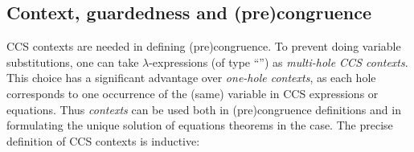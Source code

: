 
\subsection{Context, guardedness and (pre)congruence}
\label{ss:context}

CCS contexts are needed in defining (pre)congruence.
To prevent doing variable substitutions, one can take %
 \univariate $\lambda$-expressions (of type
``'') as \emph{multi-hole CCS contexts}.
%
This choice has a significant advantage over \emph{one-hole
contexts}, as each hole corresponds to one occurrence of the (same)
variable in \univariate CCS expressions or equations.
Thus \emph{contexts} can be used both in (pre)congruence definitions
and in formulating the unique solution of equations theorems in
the \univariate case. The precise definition of CCS contexts is inductive:
